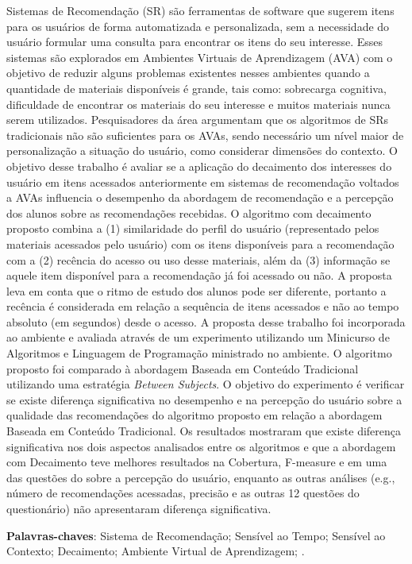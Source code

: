\begin{resumo}
  Sistemas de Recomendação (SR) são ferramentas de software que sugerem itens para os usuários de forma automatizada e
  personalizada, sem a necessidade do usuário formular uma consulta para encontrar os itens do seu interesse. Esses
  sistemas são explorados em Ambientes Virtuais de Aprendizagem (AVA) com o objetivo de reduzir alguns problemas
  existentes nesses ambientes quando a quantidade de materiais disponíveis é grande, tais como: sobrecarga cognitiva,
  dificuldade de encontrar os materiais do seu interesse e muitos materiais nunca serem utilizados. Pesquisadores da
  área argumentam que os algoritmos de SRs tradicionais não são suficientes para os AVAs, sendo necessário um nível
  maior de personalização a situação do usuário, como considerar dimensões do contexto. O objetivo desse trabalho é
  avaliar se a aplicação do decaimento dos interesses do usuário em itens acessados anteriormente em sistemas de
  recomendação voltados a AVAs influencia o desempenho da abordagem de recomendação e a percepção dos alunos sobre as
  recomendações recebidas. O algoritmo com decaimento proposto combina a (1) similaridade do perfil do usuário
  (representado pelos materiais acessados pelo usuário) com os itens disponíveis para a recomendação com a (2) recência
  do acesso ou uso desse materiais, além da (3) informação se aquele item disponível para a recomendação já foi acessado
  ou não. A proposta leva em conta que o ritmo de estudo dos alunos pode ser diferente, portanto a recência é
  considerada em relação a sequência de itens acessados e não ao tempo absoluto (em segundos) desde o acesso. A proposta
  desse trabalho foi incorporada ao ambiente \adaptwebspace e avaliada através de um experimento utilizando um Minicurso
  de Algoritmos e Linguagem de Programação ministrado no ambiente. O algoritmo proposto foi comparado à abordagem
  Baseada em Conteúdo Tradicional utilizando uma estratégia \textit{Between Subjects}. O objetivo do experimento é
  verificar se existe diferença significativa no desempenho e na percepção do usuário sobre a qualidade das
  recomendações do algoritmo proposto em relação a abordagem Baseada em Conteúdo Tradicional. Os resultados mostraram
  que existe diferença significativa nos dois aspectos analisados entre os algoritmos e que a abordagem com Decaimento
  teve melhores resultados na Cobertura, F-measure e em uma das questões do sobre a percepção do usuário, enquanto as
  outras análises (e.g., número de recomendações acessadas, precisão e as outras 12 questões do questionário) não
  apresentaram diferença significativa.

  \vspace{\onelineskip}

  \noindent
  \textbf{Palavras-chaves}: Sistema de Recomendação; Sensível ao Tempo; Sensível ao Contexto; Decaimento; Ambiente Virtual de Aprendizagem; \adaptweb.
\end{resumo}

